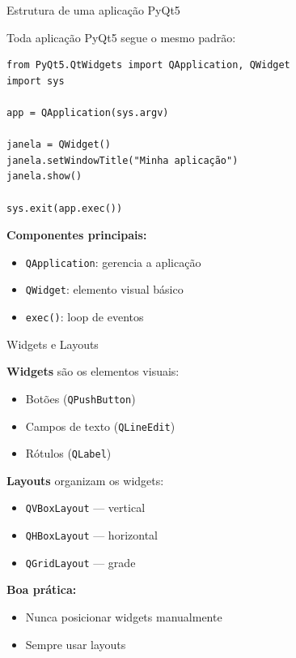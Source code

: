 \documentclass{beamer}
\begin{document}
    \begin{frame}[fragile]{Estrutura de uma aplicação PyQt5}
        
        Toda aplicação PyQt5 segue o mesmo padrão:
        
        \vspace{0.3cm}
        
        \begin{verbatim}
from PyQt5.QtWidgets import QApplication, QWidget
import sys

app = QApplication(sys.argv)

janela = QWidget()
janela.setWindowTitle("Minha aplicação")
janela.show()

sys.exit(app.exec())
        \end{verbatim}
        
        \vspace{0.3cm}
        
        \textbf{Componentes principais:}
        \begin{itemize}
            \item \texttt{QApplication}: gerencia a aplicação
            \item \texttt{QWidget}: elemento visual básico
            \item \texttt{exec()}: loop de eventos
        \end{itemize}
        
    \end{frame}
    
    \begin{frame}{Widgets e Layouts}
        
        \textbf{Widgets} são os elementos visuais:
        \begin{itemize}
            \item Botões (\texttt{QPushButton})
            \item Campos de texto (\texttt{QLineEdit})
            \item Rótulos (\texttt{QLabel})
        \end{itemize}
        
        \vspace{0.3cm}
        
        \textbf{Layouts} organizam os widgets:
        \begin{itemize}
            \item \texttt{QVBoxLayout} — vertical
            \item \texttt{QHBoxLayout} — horizontal
            \item \texttt{QGridLayout} — grade
        \end{itemize}
        
        \vspace{0.3cm}
        
        \textbf{Boa prática:}
        \begin{itemize}
            \item Nunca posicionar widgets manualmente
            \item Sempre usar layouts
        \end{itemize}
        
    \end{frame}
    
\end{document}
